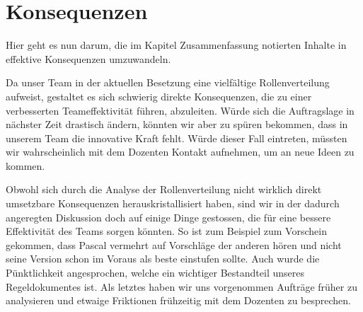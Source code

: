\chapter{Konsequenzen}
Hier geht es nun darum, die im Kapitel Zusammenfassung notierten Inhalte in effektive Konsequenzen umzuwandeln.

Da unser Team in der aktuellen Besetzung eine vielfältige Rollenverteilung aufweist, gestaltet es sich schwierig direkte Konsequenzen, die zu einer verbesserten Teameffektivität führen, abzuleiten. Würde sich die Auftragslage in nächster Zeit drastisch ändern, könnten wir aber zu spüren bekommen, dass in unserem Team die innovative Kraft fehlt. Würde dieser Fall eintreten, müssten wir wahrscheinlich mit dem Dozenten Kontakt aufnehmen, um an neue Ideen zu kommen. 

Obwohl sich durch die Analyse der Rollenverteilung nicht wirklich direkt umsetzbare Konsequenzen herauskristallisiert haben, sind wir in der dadurch angeregten Diskussion doch auf einige Dinge gestossen, die für eine bessere Effektivität des Teams sorgen könnten.
So ist zum Beispiel zum Vorschein gekommen, dass Pascal vermehrt auf Vorschläge der anderen hören und nicht seine Version schon im Voraus als beste einstufen sollte. Auch wurde die Pünktlichkeit angesprochen, welche ein wichtiger Bestandteil unseres Regeldokumentes ist. Als letztes haben wir uns vorgenommen Aufträge früher zu analysieren und etwaige Friktionen frühzeitig mit dem Dozenten zu besprechen.